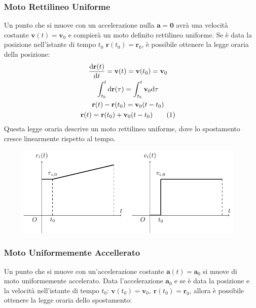 \documentclass{article}
\newcommand{\vect}[1]{\boldsymbol{\mathbf{#1}}}
\newcommand{\df}{\mathrm{d}}
\numberwithin{equation}{subsection}
\begin{document}
\subsubsection{Moto Rettilineo Uniforme}
Un punto che si muove con un accelerazione nulla $\vect{a}=\vect{0}$ avrà 
una velocità costante $\vect{v}(t)=\vect{v}_0$ e compierà un moto definito rettilineo uniforme. 
Se è data la posizione nell'istante di tempo $t_0$ $\vect{r}(t_0)=\vect{r}_0$, 
è possibile 
ottenere la legge oraria della posizione:
\begin{gather*}
    \displaystyle\frac{\df\vect{r}(t)}{\df t}=\vect{v}(t)=\vect{v}(t_0)=\vect{v}_0\\
    \displaystyle\int_{t_0}^{t}\df\vect{r}(\tau)=\int_{t_0}^{t}\vect{v}_0\df\tau\\
    \vect{r}(t)-\vect{r}(t_0)=\vect{v}_0(t-t_0)\\
    \vect{r}(t)=\vect{r}(t_0)+\vect{v}_0(t-t_0)\tag{\stepcounter{equation}\theequation}
\end{gather*}
Questa legge oraria descrive un moto rettilineo uniforme, dove 
lo spostamento cresce linearmente rispetto al tempo.

\begin{figure}[H]%
    \centering
    \includegraphics{rettilineo-uniforme.pdf}%
\end{figure}

\subsubsection{Moto Uniformemente Accellerato}

Un punto che si muove con un'accelerazione costante $\vect{a}(t)=\vect{a}_0$ si muove di moto uniformemente accelerato. 
Data l'accelerazione $\vect{a}_0$ e
se è data la posizione e la velocità nell'istante di tempo 
$t_0$: $\vect{v}(t_0)=\vect{v}_0{,}\:\vect{r}(t_0)=\vect{r}_0$, 
allora è possibile ottenere la legge oraria dello spostamento:
\end{document}
